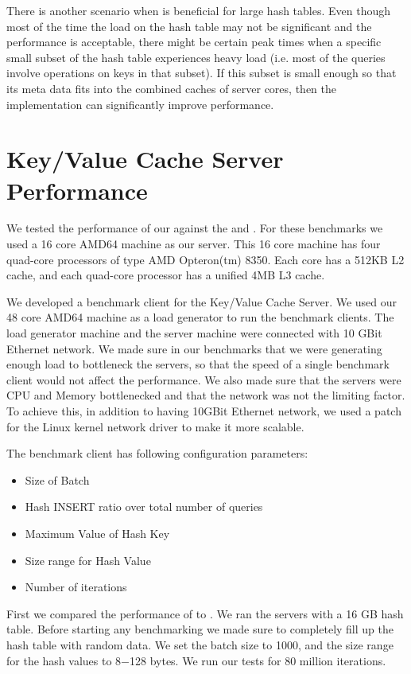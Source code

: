 There is another scenario when \cphash{} is beneficial for large hash tables. Even though most of the time the load on the hash table may not be significant
and the performance is acceptable, there might be certain peak times when a specific small subset of the hash table experiences heavy load (i.e. most of the queries involve 
operations on keys in that subset). If this subset is small enough so that its meta data fits into the combined caches of server cores, then the \cphash{} 
implementation can significantly improve performance.

\section{Key/Value Cache Server Performance}
\label{sec:mcserverbench} 

We tested the performance of our \cpserver{} against the \lockserver{} and \memcached{}. For these benchmarks we used a 16 core AMD64 machine as 
our server. This 16 core machine has four quad-core processors of type AMD Opteron(tm) 8350. Each core has a 512KB L2 cache, and each quad-core processor has a 
unified 4MB L3 cache. 

We developed a benchmark client for the Key/Value Cache Server. We used our 48 core AMD64 machine as a load generator to run the benchmark clients. 
The load generator machine and the server machine were connected with 10 GBit Ethernet network. We made sure in our benchmarks that we were generating enough load to 
bottleneck the servers, so that the speed of a single benchmark client would not affect the performance. We also made sure that the servers were CPU and Memory 
bottlenecked and that the network was not the limiting factor. To achieve this, in addition to having 10GBit Ethernet network, we used a 
patch for the Linux kernel network driver \cite{mosbench} to make it more scalable.

The benchmark client has following configuration parameters:
\begin{itemize}
\item Size of Batch
\item Hash INSERT ratio over total number of queries
\item Maximum Value of Hash Key
\item Size range for Hash Value
\item Number of iterations
\end{itemize}

First we compared the performance of \cpserver{} to \lockserver{}. We ran the servers with a 16 GB hash table. Before starting any benchmarking we 
made sure to completely fill up the hash table with random data. We set the batch size to 1000, and the size range for the hash values to 8$-$128 bytes. We run our tests 
for 80 million iterations.

